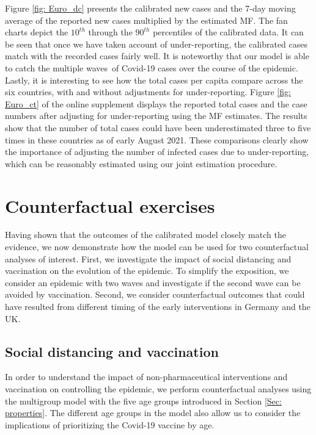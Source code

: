 \documentclass[12pt]{article}
\begin{document}
Figure \ref{fig: Euro_dc} presents the calibrated new cases and the 7-day
moving average of the reported new cases multiplied by the estimated MF. The
fan charts depict the $10^{th}$ through the $90^{th}$ percentiles of the
calibrated data. It can be seen that once we have taken account of
under-reporting, the calibrated cases match with the recorded cases fairly
well. It is noteworthy that our model is able to catch the multiple waves\ of
Covid-19 cases over the course of the epidemic. Lastly, it is interesting to
see how the total cases per capita compare across the six countries, with and
without adjustments for under-reporting. Figure \ref{fig: Euro_ct} of the
online supplement displays the reported total cases and the case numbers after
adjusting for under-reporting using the MF estimates. The results show that
the number of total cases could have been underestimated three to five times
in these countries as of early August 2021. These comparisons clearly show the
importance of adjusting the number of infected cases due to under-reporting,
which can be reasonably estimated using our joint estimation procedure.

\section{Counterfactual exercises \label{Sec: counterfactual}}

Having shown that the outcomes of the calibrated model closely match the
evidence, we now demonstrate how the model can be used for two counterfactual
analyses of interest. First, we investigate the impact of social distancing
and vaccination on the evolution of the epidemic. To simplify the exposition,
we consider an epidemic with two waves and investigate if the second wave can
be avoided by vaccination. Second, we consider counterfactual outcomes that
could have resulted from different timing of the early interventions in
Germany and the UK.

\subsection{Social distancing and vaccination \label{Sec: vacc}}

In order to understand the impact of non-pharmaceutical interventions and
vaccination on controlling the epidemic, we perform counterfactual analyses
using the multigroup model with the five age groups introduced in Section
\ref{Sec: properties}. The different age groups in the model also allow us to
consider the implications of prioritizing the Covid-19 vaccine by age.
\end{document}
